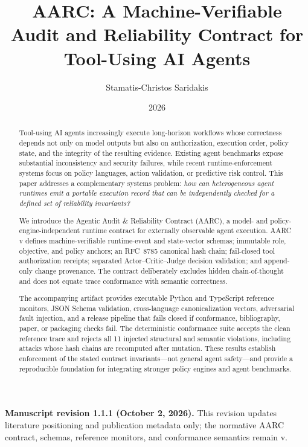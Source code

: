 \documentclass{article}
\title{AARC: A Machine-Verifiable Audit and Reliability Contract for Tool-Using AI Agents}
\author{Stamatis-Christos Saridakis}
\date{2026}
\begin{document}
\maketitle

\begin{center}
\small
\textbf{Manuscript revision 1.1.1 (October 2, 2026).}
This revision updates literature positioning and publication metadata only;
the normative AARC contract, schemas, reference monitors, and conformance
semantics remain v\specVersion{}.
\end{center}


\begin{abstract}
Tool-using AI agents increasingly execute long-horizon workflows whose correctness
depends not only on model outputs but also on authorization, execution order,
policy state, and the integrity of the resulting evidence. Existing agent
benchmarks expose substantial inconsistency and security failures, while recent
runtime-enforcement systems focus on policy languages, action validation, or
predictive risk control. This paper addresses a complementary systems problem:
\emph{how can heterogeneous agent runtimes emit a portable execution record that
can be independently checked for a defined set of reliability invariants?}

We introduce the Agentic Audit \& Reliability Contract (AARC), a model- and
policy-engine-independent runtime contract for externally observable agent
execution. AARC v\specVersion{} defines machine-verifiable runtime-event and
state-vector schemas; immutable role, objective, and policy anchors; an
RFC~8785 canonical hash chain; fail-closed tool authorization receipts; separated
Actor--Critic--Judge decision validation; and append-only change provenance.
The contract deliberately excludes hidden chain-of-thought and does not equate
trace conformance with semantic correctness.

The accompanying artifact provides executable Python and TypeScript reference
monitors, JSON Schema validation, cross-language canonicalization vectors,
adversarial fault injection, and a release pipeline that fails closed if
conformance, bibliography, paper, or packaging checks fail. The deterministic
conformance suite accepts the clean reference trace and rejects all 11 injected
structural and semantic violations, including attacks whose hash chains are
recomputed after mutation. These results establish enforcement of the stated
contract invariants---not general agent safety---and provide a reproducible
foundation for integrating stronger policy engines and agent benchmarks.
\end{abstract}
\end{document}
